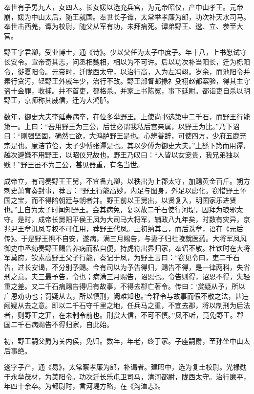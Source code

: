 \documentclass[]{article}
\begin{document}
奉世有子男九人，女四人。长女媛以选充兵宫，为元帝昭仪，产中山孝王。元帝崩，媛为中山太后，随王就国。奉世长子谭，太常举孝廉为郎，功次补天水司马。奉世击西羌，谭为校尉，随父从军有功，未拜病死。谭弟野王、逡、立、参至大官。

野王字君卿，受业博士，通《诗》。少以父任为太子中庶子。年十八，上书愿试守长安令。宣帝奇其志，问丞相魏相，相以为不可许。后以功次补当阳长，迁为栎阳令，徙夏阳令。元帝时，迁陇西太守，以治行高，入为左冯翊。岁余，而池阳令并素行贪污，轻野王外戚年少，治行不改。野王部督邮掾礻殳祤赵都案验，得其主守盗十金罪，收捕。并不首吏，都格杀。并家上书陈冤，事下廷尉。都诣吏自杀以明野王，京师称其威信，迁为大鸿胪。

数年，御史大夫李延寿病卒，在位多举野王。上使尚书选第中二千石，而野王行能第一。上曰：``吾用野王为三公，后世必谓我私后宫亲属，以野王为比。''乃下诏曰：``刚强坚固，确然亡欲，大鸿胪野王是也。心辨善辞，可使四方，少府五鹿充宗是也。廉洁节俭，太子少傅张谭是也。其以少傅为御史大夫。''上繇下第而用谭，越次避嫌不用野王，以昭仪兄故也。野王乃叹曰：``人皆以女宠贵，我兄弟独以贱！''野王虽不为三公，甚见器重，有名当世。

成帝立，有司奏野王王舅，不宜备九卿，以秩出为上郡太守，加赐黄金百斤。朔方刺史萧育奏封事，荐言：``野王行能高妙，内足与图身，外足以虑化。窃惜野王怀国之宝，而不得陪朝廷与朝者并。野王前以王舅出，以贤复入，明国家乐进贤也。''上自为太子时闻知野王。会其病免，复以故二千石使行河堤，因拜为琅邪太守。是时，成帝长舅阳平侯王凤为大司马大将军，辅政八九年矣，时数有灾异，京兆尹王章讥凤专权不可任用，荐野王代凤。上初纳其言，而后诛章，语在《元后传》。于是野王惧不自安，遂病，满三月赐告，与妻子归杜陵就医药。大将军凤风御史中丞劾奏野王赐告养病而私自便，持虎符出界归家，奉诏不敬。杜钦时在大将军莫府，钦素高野王父子行能，奏记于凤，为野王言曰：``窃见令曰，吏二千石告，过长安谒，不分别予赐。今有司以为予告得归，赐告不得，是一律两科，失省刑之意。夫三最予告，令也；病满三月赐告，诏恩也。令告则得，诏恩不得，失轻重之差。又二千石病赐告得归有故事，不得去郡亡著令。传曰：`赏疑从予，所以广恩劝功也；罚疑从去，所以慎刑，阙难知也。'今释令与故事而假不敬之法，甚违阙疑从去之意。即以二千石守千里之地，任兵马之重，不宜去郡，将以制刑为后法者，则野王之罪，在未制令前也。刑赏大信，不可不慎。''凤不听，竟免野王。郡国二千石病赐告不得归家，自此始。

初，野王嗣父爵为关内侯，免归。数年，年老，终于家。子座嗣爵，至孙坐中山太后事绝。

逡字子产，通《易》，太常察孝廉为郎，补谒者。建昭中，选为复土校尉。光禄勋于永举茂材，为美阳令。功次迁长乐屯卫司马，清河都尉，陇西太守。治行廉平，年四十余卒。为都尉时，言河堤方略，在《沟洫志》。
\end{document}
